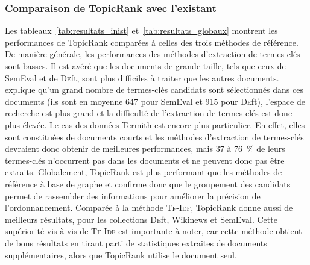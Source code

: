       \subsubsection{Comparaison de TopicRank avec l'existant}
      \label{subsubsec:main:domain_independent_keyphrase_extraction-unsupervised_automatic_keyphrase_extraction-evaluation-comparison}
        Les tableaux~\ref{tab:resultats_inist} et~\ref{tab:resultats_globaux}
        montrent les performances de TopicRank comparées à celles des trois
        méthodes de référence. De manière générale, les performances des
        méthodes d'extraction de termes-clés sont basses. Il est avéré que les
        documents de grande taille, tels que ceux de SemEval et de
        \textsc{De}ft, sont plus difficiles à traiter que les autres documents.
         explique qu'un grand nombre de
        termes-clés candidats sont sélectionnés dans ces documents (ils sont en
        moyenne 647 pour SemEval et 915 pour \textsc{De}ft), l'espace de
        recherche est plus grand et la difficulté de l'extraction de termes-clés
        est donc plus élevée. Le cas des données Termith
        est encore plus particulier. En effet, elles sont constituées de
        documents courts et les méthodes d'extraction de termes-clés devraient
        donc obtenir de meilleures performances, mais 37 à 76~\% de leurs
        termes-clés n'occurrent pas dans les documents et ne peuvent donc pas
        être extraits.
        Globalement, TopicRank est plus performant que les méthodes de référence
        à base de graphe et confirme donc que le groupement des candidats
        permet de rassembler des informations pour améliorer la précision de
        l'ordonnancement.
        Comparée à la méthode \textsc{Tf-Idf}, TopicRank donne aussi de meilleurs
        résultats, pour les collections \textsc{De}ft, Wikinews et SemEval.
        Cette supériorité vis-à-vis de \textsc{Tf-Idf} est importante à noter, car cette
        méthode obtient de bons résultats en tirant parti de statistiques
        extraites de documents supplémentaires, alors que TopicRank utilise le
        document seul.
